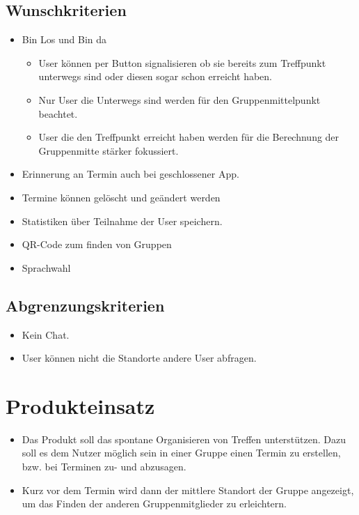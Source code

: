 \documentclass{scrartcl}
\begin{document}
	\subsection{Wunschkriterien}
		\begin{itemize}
		\item \grqq{}Bin Los\grqq{} und \grqq{}Bin da\grqq{}
			\begin{itemize}
			\item User können per Button signalisieren ob sie bereits zum Treffpunkt unterwegs sind oder diesen sogar schon erreicht haben.
			\item Nur User die Unterwegs sind werden für den Gruppenmittelpunkt beachtet.
			\item User die den Treffpunkt erreicht haben werden für die Berechnung der Gruppenmitte stärker fokussiert.
			\end{itemize}
		\item Erinnerung an Termin auch bei geschlossener App.
		\item Termine können gelöscht und geändert werden
		\item Statistiken über Teilnahme der User speichern.
		\item QR-Code zum finden von Gruppen
		\item Sprachwahl
		\end{itemize}
	\subsection{Abgrenzungskriterien}
		\begin{itemize}
		\item Kein Chat.
		\item User können nicht die Standorte andere User abfragen.
		\end{itemize}

	\newpage

	

	\section{Produkteinsatz}
	\begin{itemize}	        
		\item Das Produkt soll das spontane Organisieren von Treffen unterstützen. Dazu soll es dem Nutzer möglich sein in einer Gruppe einen Termin zu erstellen, bzw. bei Terminen zu- und abzusagen.
		\item Kurz vor dem Termin wird dann der mittlere Standort der Gruppe angezeigt, um das Finden der anderen Gruppenmitglieder zu erleichtern.
		\end{itemize}
\end{document}
